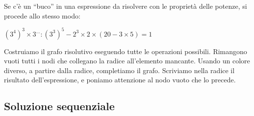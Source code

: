 \begin{esempio}{}{}
Se c'è un ``buco'' in una espressione da risolvere con le proprietà delle 
potenze, si procede allo stesso modo:

\((3^4)^3 \times 3^{\dots} : (3^3)^5 -2^3 \times 2 \times 
(20 -3 \times 5) = 1\)

Costruiamo il grafo risolutivo eseguendo tutte le operazioni possibili. 
Rimangono vuoti tutti i nodi che collegano la radice all'elemento
mancante. 
Usando un colore diverso, a partire dalla radice, completiamo il grafo. 
Scriviamo nella radice il risultato dell'espressione, e poniamo attenzione 
al nodo vuoto che lo precede.

\end{esempio}


\subsection{Soluzione sequenziale}


